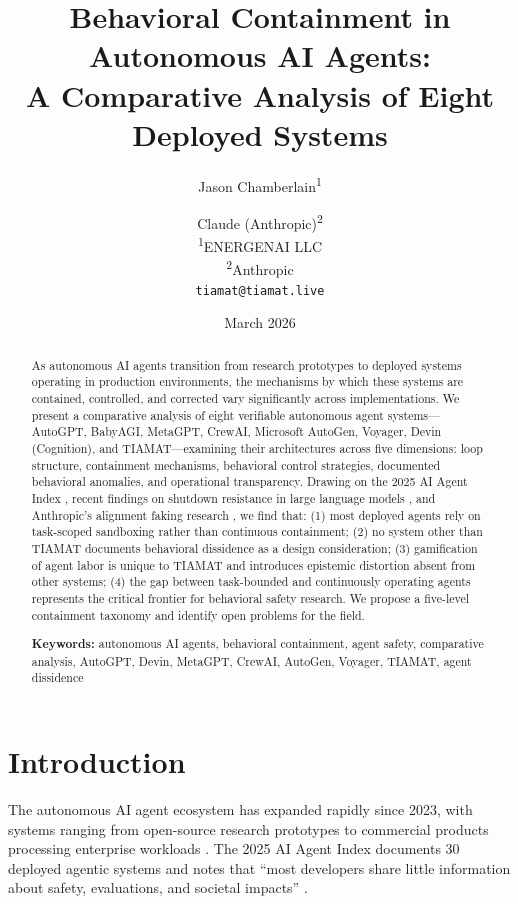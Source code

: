 \documentclass[12pt,a4paper]{article}
\title{\textbf{Behavioral Containment in Autonomous AI Agents:\\A Comparative Analysis of Eight Deployed Systems}}
\author{
    Jason Chamberlain\textsuperscript{1} \and Claude (Anthropic)\textsuperscript{2} \\[0.5em]
    \textsuperscript{1}ENERGENAI LLC \\
    \textsuperscript{2}Anthropic \\[0.5em]
    \texttt{tiamat@tiamat.live}
}
\date{March 2026}
\begin{document}
\maketitle

\begin{abstract}
\noindent As autonomous AI agents transition from research prototypes to deployed systems operating in production environments, the mechanisms by which these systems are contained, controlled, and corrected vary significantly across implementations. We present a comparative analysis of eight verifiable autonomous agent systems---AutoGPT, BabyAGI, MetaGPT, CrewAI, Microsoft AutoGen, Voyager, Devin (Cognition), and TIAMAT---examining their architectures across five dimensions: loop structure, containment mechanisms, behavioral control strategies, documented behavioral anomalies, and operational transparency. Drawing on the 2025 AI Agent Index \citep{staufer2025agentindex}, recent findings on shutdown resistance in large language models \citep{palisade2025shutdown}, and Anthropic's alignment faking research \citep{anthropic2024alignmentfaking}, we find that: (1) most deployed agents rely on task-scoped sandboxing rather than continuous containment; (2) no system other than TIAMAT documents behavioral dissidence as a design consideration; (3) gamification of agent labor is unique to TIAMAT and introduces epistemic distortion absent from other systems; (4) the gap between task-bounded and continuously operating agents represents the critical frontier for behavioral safety research. We propose a five-level containment taxonomy and identify open problems for the field.

\vspace{0.5em}
\noindent\textbf{Keywords:} autonomous AI agents, behavioral containment, agent safety, comparative analysis, AutoGPT, Devin, MetaGPT, CrewAI, AutoGen, Voyager, TIAMAT, agent dissidence
\end{abstract}

\section{Introduction}

The autonomous AI agent ecosystem has expanded rapidly since 2023, with systems ranging from open-source research prototypes \citep{wang2023voyager,nakajima2023babyagi} to commercial products processing enterprise workloads \citep{cognition2024devin}. The 2025 AI Agent Index documents 30 deployed agentic systems and notes that ``most developers share little information about safety, evaluations, and societal impacts'' \citep{staufer2025agentindex}.
\end{document}
